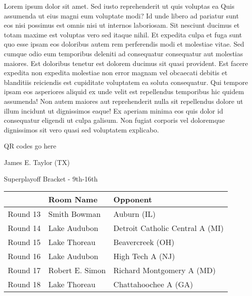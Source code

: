 \documentclass{article}%
\begin{document}
\vspace*{8pt}%
\linebreak%
\newline%
\newline%
Lorem ipsum dolor sit amet. Sed iusto reprehenderit ut quis voluptas ea Quis assumenda ut eius magni eum voluptate modi? Id unde libero ad pariatur sunt eos nisi possimus est omnis nisi ut internos laboriosam. Sit nesciunt ducimus et totam maxime est voluptas vero sed itaque nihil. Et expedita culpa et fuga sunt quo esse ipsam eos doloribus autem rem perferendis modi et molestiae vitae.\newline%
\newline%
Sed cumque odio eum temporibus deleniti ad consequatur consequatur aut molestias maiores. Est doloribus tenetur est dolorem ducimus sit quasi provident. Est facere expedita non expedita molestiae non error magnam vel obcaecati debitis et blanditiis reiciendis est cupiditate voluptatem ea soluta consequatur. Qui tempore ipsam eos asperiores aliquid ex unde velit est repellendus temporibus hic quidem assumenda!\newline%
\newline%
Non autem maiores aut reprehenderit nulla sit repellendus dolore ut illum incidunt ut dignissimos eaque! Ex aperiam minima eos quis dolor id consequatur eligendi ut culpa galisum. Non fugiat corporis vel doloremque dignissimos sit vero quasi sed voluptatem explicabo.\newline%
\newline%
%
\vspace*{30pt}%
\begin{center}%
\begin{Huge}%
QR codes go here%
\end{Huge}%
\end{center}%
\newpage%
\begin{center}%
\begin{Huge}%
James E. Taylor (TX)%
\end{Huge}%
\vspace*{8pt}%
\linebreak%
\begin{Large}%
Superplayoff Bracket {-} 9th{-}16th%
\end{Large}%
\end{center}%
%
\begin{tabularx}{\textwidth}{|c|Y|Y|}%
\hline%
&Room Name&Opponent\\%
\hline%
Round 13&Smith Bowman&Auburn (IL)\\%
Round 14&Lake Audubon&Detroit Catholic Central A (MI)\\%
Round 15&Lake Thoreau&Beavercreek (OH)\\%
Round 16&Lake Audubon&High Tech A (NJ)\\%
Round 17&Robert E. Simon&Richard Montgomery A (MD)\\%
Round 18&Lake Thoreau&Chattahoochee A (GA)\\%
\hline%
\end{tabularx}%
\end{document}
